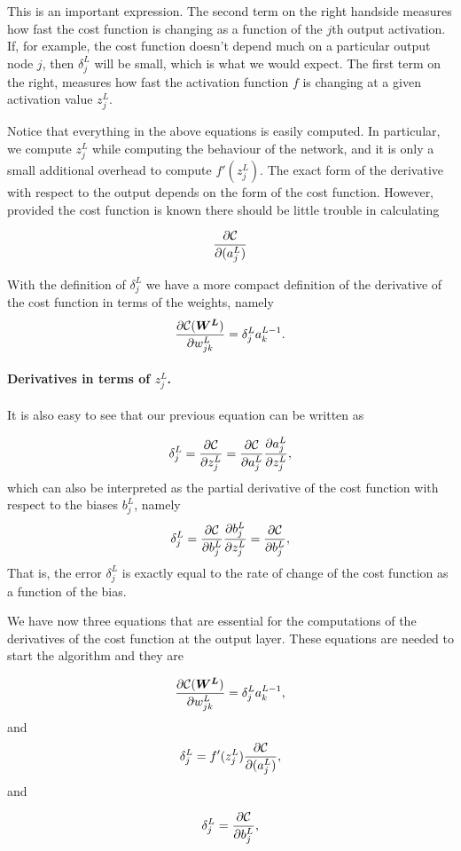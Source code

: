\documentclass[%
oneside,                 %
final,                   %
10pt]{article}
\newenvironment{block_mdfboxadmon}[1][]{
\begin{block_mdfboxmdframed}[frametitle=#1]
}
{
\end{block_mdfboxmdframed}
}
\begin{document}
This is an important expression. The second term on the right handside
measures how fast the cost function is changing as a function of the $j$th
output activation.  If, for example, the cost function doesn't depend
much on a particular output node $j$, then $\delta_j^L$ will be small,
which is what we would expect. The first term on the right, measures
how fast the activation function $f$ is changing at a given activation
value $z_j^L$.

Notice that everything in the above equations is easily computed.  In
particular, we compute $z_j^L$ while computing the behaviour of the
network, and it is only a small additional overhead to compute
$f'(z^L_j)$.  The exact form of the derivative with respect to the
output depends on the form of the cost function.
However, provided the cost function is known there should be little
trouble in calculating

\[
\frac{\partial {\cal C}}{\partial (a_j^L)}
\]

With the definition of $\delta_j^L$ we have a more compact definition of the derivative of the cost function in terms of the weights, namely
\[
\frac{\partial{\cal C}(\boldsymbol{W^L})}{\partial w_{jk}^L}  =  \delta_j^La_k^{L-1}.
\]

\paragraph{Derivatives in terms of $z_j^L$.}
It is also easy to see that our previous equation can be written as

\[
\delta_j^L =\frac{\partial {\cal C}}{\partial z_j^L}= \frac{\partial {\cal C}}{\partial a_j^L}\frac{\partial a_j^L}{\partial z_j^L},
\]
which can also be interpreted as the partial derivative of the cost function with respect to the biases $b_j^L$, namely
\[
\delta_j^L = \frac{\partial {\cal C}}{\partial b_j^L}\frac{\partial b_j^L}{\partial z_j^L}=\frac{\partial {\cal C}}{\partial b_j^L},
\]
That is, the error $\delta_j^L$ is exactly equal to the rate of change of the cost function as a function of the bias. 


We have now three equations that are essential for the computations of the derivatives of the cost function at the output layer. These equations are needed to start the algorithm and they are


\begin{block_mdfboxadmon}

\begin{equation}
\frac{\partial{\cal C}(\boldsymbol{W^L})}{\partial w_{jk}^L}  =  \delta_j^La_k^{L-1},
\end{equation}
and
\begin{equation}
\delta_j^L = f'(z_j^L)\frac{\partial {\cal C}}{\partial (a_j^L)},
\end{equation}
and

\begin{equation}
\delta_j^L = \frac{\partial {\cal C}}{\partial b_j^L},
\end{equation}
\end{block_mdfboxadmon} %
\end{document}
